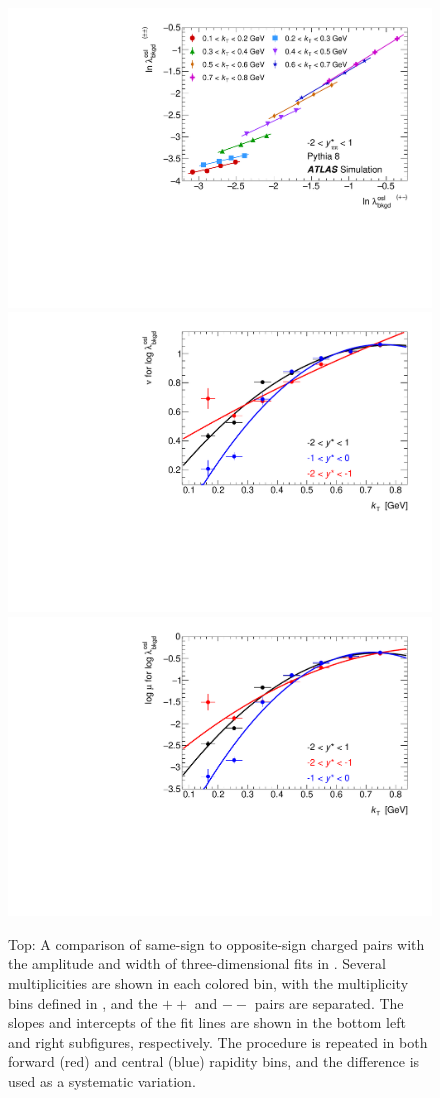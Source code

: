 \begin{figure}[t]
\begin{minipage}[t]{1.0\textwidth}
\centering
\includegraphics{can_kt_qosl_backLambda.pdf}\\
\includegraphics[width=.49\linewidth]{can_kt_qosl_backLambda_slope_combined.pdf}
\includegraphics[width=.49\linewidth]{can_kt_qosl_backLambda_intercept_combined.pdf}
\end{minipage}
\caption{
Top: A comparison of same-sign to opposite-sign charged pairs with the amplitude and width of three-dimensional fits in . Several multiplicities are shown in each colored \kt bin, with the multiplicity bins defined in , and the $++$ and $--$ pairs are separated. The slopes and intercepts of the fit lines are shown in the bottom left and right subfigures, respectively. The procedure is repeated in both forward (red) and central (blue) rapidity bins, and the difference is used as a systematic variation.}
\label{fig:background_qosl_lambda_same_vs_opp_pythia8}
\end{figure}


